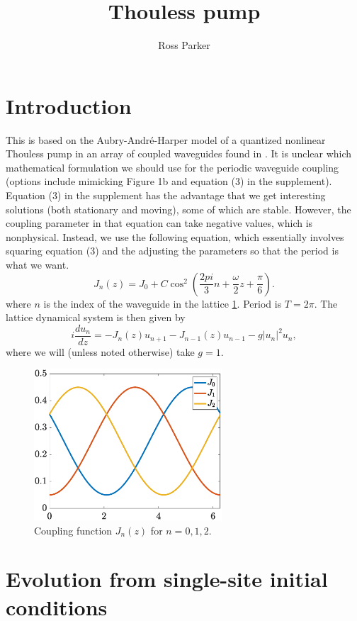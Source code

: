 \documentclass{article}
\title{Thouless pump}
\author{Ross Parker}
\begin{document}
\maketitle

\section{Introduction}

This is based on the Aubry-Andr\'e-Harper model of a quantized nonlinear Thouless pump in an array of coupled waveguides found in \cite{Jurgensen2021}. It is unclear which mathematical formulation we should use for the periodic waveguide coupling (options include mimicking Figure 1b and equation (3) in the supplement). Equation (3) in the supplement has the advantage that we get interesting solutions (both stationary and moving), some of which are stable. However, the coupling parameter in that equation can take negative values, which is nonphysical. Instead, we use the following equation, which essentially involves squaring equation (3) and the adjusting the parameters so that the period is what we want.
\[
J_n(z)= J_0 + C \cos^2\left(  \frac{2 pi}{3} n + \frac{\omega}{2} z + \frac{\pi}{6} \right).
\]
where $n$ is the index of the waveguide in the lattice \cref{fig:J}. Period is $T=2\pi$. The lattice dynamical system is then given by
\[
i \frac{d u_n}{d z} =
-J_n(z) u_{n+1} - J_{n-1}(z)u_{n-1} - g|u_n|^2 u_n,
\]
where we will (unless noted otherwise) take $g = 1$.

\begin{figure}
    \centering
    \includegraphics[width=7cm]{J}
    \caption{Coupling function $J_n(z)$ for $n = 0,1,2$.}
    \label{fig:J}
\end{figure}

\section{Evolution from single-site initial conditions}
\end{document}
